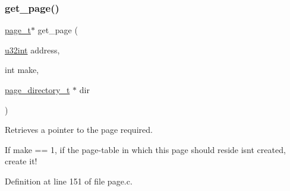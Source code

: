 \subsubsection{\texorpdfstring{get\+\_\+page()}{get\_page()}}
{\footnotesize\ttfamily \hyperlink{a00101_a76113662e059e0926a92c5b15c098f4a_a76113662e059e0926a92c5b15c098f4a}{page\+\_\+t}$\ast$ get\+\_\+page (\begin{DoxyParamCaption}\item[{\hyperlink{a00116_a7ae3a26c17ddfe117c6291739780801d_a7ae3a26c17ddfe117c6291739780801d}{u32int}}]{address,  }\item[{int}]{make,  }\item[{\hyperlink{a00101_aa6e79064ffe1eb8c43be4dc1be3f64a1_aa6e79064ffe1eb8c43be4dc1be3f64a1}{page\+\_\+directory\+\_\+t} $\ast$}]{dir }\end{DoxyParamCaption})}



Retrieves a pointer to the page required. 

If make == 1, if the page-\/table in which this page should reside isn\textquotesingle{}t created, create it! 

Definition at line 151 of file page.\+c.


